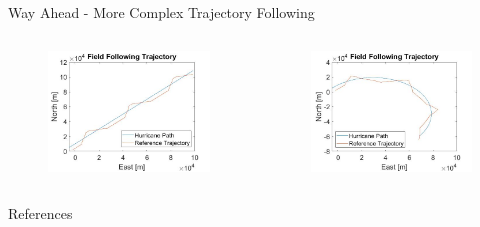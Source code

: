 \documentclass[aspectratio=169]{beamer}
\begin{document}
\begin{frame}{Way Ahead - More Complex Trajectory Following}
    \begin{columns}
        \begin{column}{0.5\textwidth}
            \begin{figure}
                \centering
                \includegraphics[width=1\textwidth]{FieldFollowingTrajectory.jpg}
            \end{figure}
        \end{column}
        \begin{column}{0.5\textwidth}
            \begin{figure}
                \centering
                \includegraphics[width=1\textwidth]{FieldFollowingTrajectory2.jpg}
            \end{figure}
        \end{column}
    \end{columns}
\end{frame}

\begin{frame}[allowframebreaks]{References}
    \nocite{*}
    \footnotesize
    
    
\end{frame}
\end{document}
